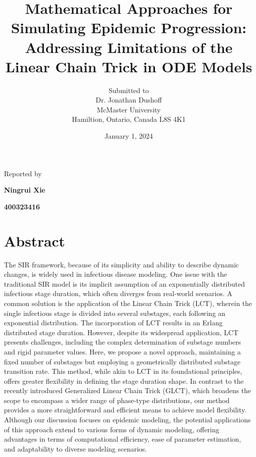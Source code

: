 \documentclass[12pt]{article}
\begin{document}
\title{Mathematical Approaches for Simulating Epidemic Progression: Addressing Limitations of the Linear Chain Trick in ODE Models}

\author{Submitted to\\ Dr. Jonathan Dushoff 
\\McMaster University\\Hamiltion, Ontario, Canada L8S 4K1}
\date {January 1, 2024}
\maketitle

\centerline{Reported by}
\centerline{\textbf{Ningrui Xie}}
\centerline{\textbf{400323416}}


\newpage
\section{Abstract}
The SIR framework, because of its simplicity and ability to describe dynamic changes, is widely used in infectious disease modeling. One issue with the traditional SIR model is its implicit assumption of an exponentially distributed infectious stage duration, which often diverges from real-world scenarios. A common solution is the application of the Linear Chain Trick (LCT), wherein the single infectious stage is divided into several substages, each following an exponential distribution. The incorporation of LCT results in an Erlang distributed stage duration. However, despite its widespread application, LCT presents challenges, including the complex determination of substage numbers and rigid parameter values. Here, we propose a novel approach, maintaining a fixed number of substages but employing a geometrically distributed substage transition rate. This method, while akin to LCT in its foundational principles, offers greater flexibility in defining the stage duration shape. In contrast to the recently introduced Generalized Linear Chain Trick (GLCT), which broadens the scope to encompass a wider range of phase-type distributions, our method provides a more straightforward and efficient means to achieve model flexibility. Although our discussion focuses on epidemic modeling, the potential applications of this approach extend to various forms of dynamic modeling, offering advantages in terms of computational efficiency, ease of parameter estimation, and adaptability to diverse modeling scenarios. 
\end{document}
